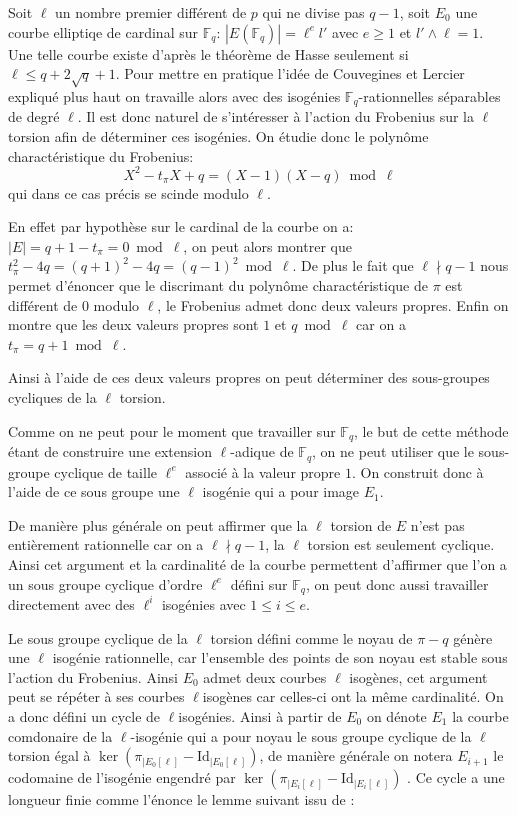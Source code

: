 \documentclass[10pt,a4paper]{book}
\theoremstyle{plain}
\theoremstyle{definition}
\theoremstyle{definition}
\theoremstyle{definition}
\theoremstyle{definition}
\theoremstyle{remark}
\theoremstyle{remark}
\begin{document}
Soit $\ell$ un nombre premier différent de $p$ qui ne divise pas $q-1$, soit $E_0$ une courbe elliptiqe de cardinal sur $\mathbb{F}_q$: $|E(\mathbb{F}_q)|=\ell^e l'$ avec $e \geqslant 1$ et $l' \wedge \ell =1$. Une telle courbe existe d'après le théorème de Hasse seulement si $\ell \leqslant q+2\sqrt{q} +1$.  
Pour mettre en pratique l'idée de Couvegines et Lercier expliqué plus haut on travaille alors avec des isogénies $\mathbb{F}_q$-rationnelles séparables de degré $\ell$. Il est donc naturel de s'intéresser à l'action du Frobenius sur la $\ell$ torsion afin de déterminer ces isogénies. On étudie donc le polynôme charactéristique du Frobenius:
\begin{equation*}
X^2-t_{\pi}X+q=(X-1)(X-q) \bmod \ell
\end{equation*}
qui dans ce cas précis se scinde modulo $\ell$.

En effet par hypothèse sur le cardinal de la courbe on a: $|E|=q+1-t_{\pi}=0 \bmod \ell$, on peut alors montrer que $t_{\pi}^2-4q=(q+1)^2-4q=(q-1)^2 \bmod \ell$. De plus le fait que $\ell \nmid q-1$ nous permet d'énoncer que le discrimant du polynôme charactéristique de $\pi$ est différent de $0$ modulo $\ell$, le Frobenius admet donc deux valeurs propres. Enfin on montre que les deux valeurs propres sont $1$ et $q \bmod \ell$ car on a $t_{\pi}=q+1 \bmod \ell$.

Ainsi à l'aide de ces deux valeurs propres on peut déterminer des sous-groupes cycliques de la $\ell$ torsion. 

Comme on ne peut pour le moment que travailler sur $\mathbb{F}_q$, le but de cette méthode étant de construire une extension $\ell$-adique de $\mathbb{F}_q$, on ne peut utiliser que le sous-groupe cyclique de taille $\ell^e$ associé à la valeur propre $1$. On construit donc à l'aide de ce sous groupe une $\ell$ isogénie qui a pour image $E_1$. 

De manière plus générale  on peut affirmer que la $\ell$ torsion de $E$ n'est pas entièrement rationnelle car on a $\ell \nmid q-1$, la $\ell$ torsion est seulement cyclique. Ainsi cet argument et la cardinalité de la courbe permettent d'affirmer que l'on a un sous groupe cyclique d'ordre $\ell^e$ défini sur $\mathbb{F}_q$, on peut donc aussi travailler directement avec des $\ell^i$ isogénies avec $1 \leqslant i \leqslant e$.

Le sous groupe cyclique de la $\ell$ torsion défini comme le noyau de $\pi -q$ génère une $\ell$ isogénie rationnelle, car l'ensemble des points de son noyau est stable sous l'action du Frobenius. Ainsi $E_0$ admet deux courbes $\ell$ isogènes, cet argument peut se répéter à ses courbes $\ell$isogènes car celles-ci ont la même cardinalité. On a donc défini un cycle de $\ell$isogénies. Ainsi à partir de $E_0$ on dénote $E_1$ la courbe comdonaire de la $\ell$-isogénie qui a pour noyau le sous groupe cyclique de la $\ell$ torsion égal à $\ker (\pi_{|E_0[\ell]} - \mathrm{Id}_{|E_0[\ell]})$, de manière générale on notera $E_{i+1}$ le codomaine de l'isogénie engendré par $\ker (\pi_{|E_i[\ell]} - \mathrm{Id}_{|E_i[\ell]})$ . Ce cycle a une longueur finie comme l'énonce le lemme suivant issu de \cite{DeFeo-Doliskani-Schost13}:
\end{document}
